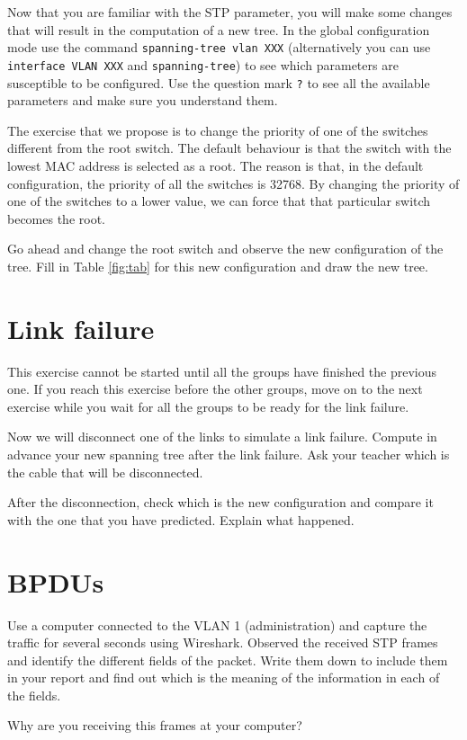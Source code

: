 Now that you are familiar with the STP parameter, you will make some changes that will result in the computation of a new tree.
In the global configuration mode use the command \texttt{spanning-tree vlan XXX} (alternatively you can use \texttt{interface VLAN XXX} and \texttt{spanning-tree}) to see which parameters are susceptible to be configured.
Use the question mark \texttt{?} to see all the available parameters and make sure you understand them.

The exercise that we propose is to change the priority of one of the switches different from the root switch.
The default behaviour is that the switch with the lowest MAC address is selected as a root.
The reason is that, in the default configuration, the priority of all the switches is 32768.
By changing the priority of one of the switches to a lower value, we can force that that particular switch becomes the root.

Go ahead and change the root switch and observe the new configuration of the tree.
Fill in Table \ref{fig:tab} for this new configuration and draw the new tree.

\section{Link failure}

This exercise cannot be started until all the groups have finished the previous one.
If you reach this exercise before the other groups, move on to the next exercise while you wait for all the groups to be ready for the link failure.

Now we will disconnect one of the links to simulate a link failure.
Compute in advance your new spanning tree after the link failure.
Ask your teacher which is the cable that will be disconnected.

After the disconnection, check which is the new configuration and compare it with the one that you have predicted.
Explain what happened.

\section{BPDUs}

Use a computer connected to the VLAN 1 (administration) and capture the traffic for several seconds using Wireshark.
Observed the received STP frames and identify the different fields of the packet.
Write them down to include them in your report and find out which is the meaning of the information in each of the fields.

Why are you receiving this frames at your computer?
